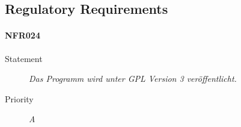 \subsection{Regulatory Requirements}

\paragraph{NFR024}
\begin{description}
\item[Statement] \textit{Das Programm wird unter GPL Version 3 veröffentlicht.}
\item[Priority] \textit{A}
\end{description}

